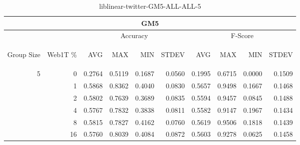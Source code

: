 \begin{center}
\begin{table}[htbp]
\begin{tabular}{ | r | r | r | r | r | r | r | r | r | r |}
\hline
\multicolumn{10}{|c|}{GM5}\\
\hline
 & & \multicolumn{4}{|c|}{Accuracy} & \multicolumn{4}{|c|}{F-Score}\\ \cline{3-10}
\begin{sideways}Group Size\end{sideways} & \begin{sideways}Web1T \%\end{sideways} & \begin{sideways}AVG\end{sideways} & \begin{sideways}MAX\end{sideways} & \begin{sideways}MIN\end{sideways} & \begin{sideways}STDEV\end{sideways} & \begin{sideways}AVG\end{sideways} & \begin{sideways}MAX\end{sideways} & \begin{sideways}MIN\end{sideways} & \begin{sideways}STDEV\end{sideways}\\
\hline
\multirow{6}{*}{5}
 & 0 & 0.2764 & 0.5119 & 0.1687 & 0.0560 & 0.1995 & 0.6715 & 0.0000 & 0.1509\\ \cline{2-10}
 & 1 & 0.5868 & 0.8362 & 0.4040 & 0.0830 & 0.5657 & 0.9498 & 0.1667 & 0.1468\\ \cline{2-10}
 & 2 & 0.5802 & 0.7639 & 0.3689 & 0.0835 & 0.5594 & 0.9457 & 0.0845 & 0.1488\\ \cline{2-10}
 & 4 & 0.5767 & 0.7832 & 0.3838 & 0.0811 & 0.5582 & 0.9147 & 0.1967 & 0.1434\\ \cline{2-10}
 & 8 & 0.5815 & 0.7827 & 0.4162 & 0.0760 & 0.5619 & 0.9506 & 0.1818 & 0.1439\\ \cline{2-10}
 & 16 & 0.5760 & 0.8039 & 0.4084 & 0.0872 & 0.5603 & 0.9278 & 0.0625 & 0.1458\\ \cline{2-10}
\hline
\end{tabular}
\caption{liblinear-twitter-GM5-ALL-ALL-5}
\end{table}
\end{center}

